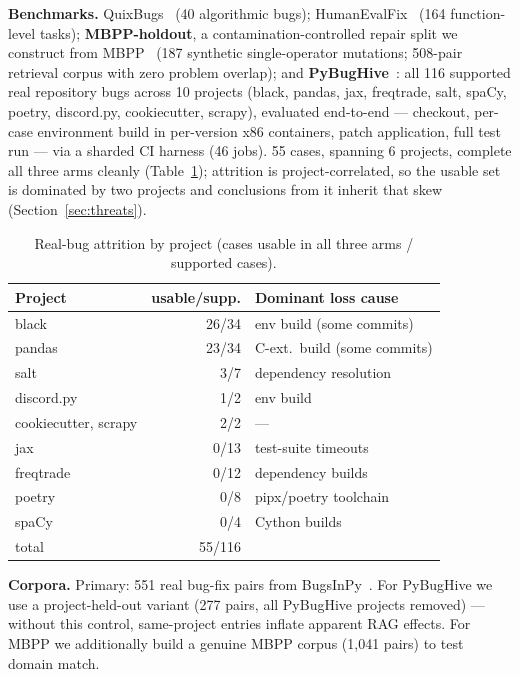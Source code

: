 \documentclass[10pt,conference]{IEEEtran}
\begin{document}
\textbf{Benchmarks.} QuixBugs~\cite{quixbugs} (40 algorithmic bugs);
HumanEvalFix~\cite{octopack} (164 function-level tasks);
\textbf{MBPP-holdout}, a contamination-controlled repair split we construct
from MBPP~\cite{mbpp} (187 synthetic single-operator mutations; 508-pair
retrieval corpus with zero problem overlap); and
\textbf{PyBugHive}~\cite{pybughive}: all 116 supported real repository bugs
across 10 projects (black, pandas, jax, freqtrade, salt, spaCy, poetry,
discord.py, cookiecutter, scrapy), evaluated end-to-end --- checkout,
per-case environment build in per-version x86 containers, patch application,
full test run --- via a sharded CI harness (46 jobs). 55 cases, spanning 6
projects, complete all three arms cleanly (Table~\ref{tab:attrition});
attrition is project-correlated, so the usable set is dominated by two
projects and conclusions from it inherit that skew
(Section~\ref{sec:threats}).

\begin{table}[!htb]
\caption{Real-bug attrition by project (cases usable in all three arms /
supported cases).}
\label{tab:attrition}
\centering
\footnotesize
\begin{tabular}{@{}lrl@{}}
\toprule
Project & usable/supp. & Dominant loss cause \\
\midrule
black & 26/34 & env build (some commits) \\
pandas & 23/34 & C-ext.\ build (some commits) \\
salt & 3/7 & dependency resolution \\
discord.py & 1/2 & env build \\
cookiecutter, scrapy & 2/2 & --- \\
jax & 0/13 & test-suite timeouts \\
freqtrade & 0/12 & dependency builds \\
poetry & 0/8 & pipx/poetry toolchain \\
spaCy & 0/4 & Cython builds \\
\midrule
total & 55/116 & \\
\bottomrule
\end{tabular}
\end{table}

\textbf{Corpora.} Primary: 551 real bug-fix pairs from
BugsInPy~\cite{bugsinpy}. For PyBugHive we use a project-held-out variant
(277 pairs, all PyBugHive projects removed) --- without this control,
same-project entries inflate apparent RAG effects. For MBPP we additionally
build a genuine MBPP corpus (1{,}041 pairs) to test domain match.
\end{document}
